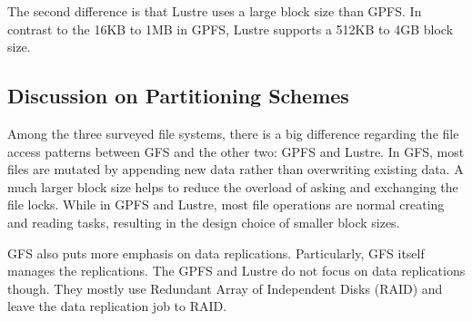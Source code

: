 The second difference is that Lustre uses a large block size than GPFS.
%
In contrast to the 16KB to 1MB in GPFS, Lustre supports a 512KB to 4GB 
block size.


\subsection{Discussion on Partitioning Schemes}
\label{sec:discuss_partitioning}
%
Among the three surveyed file systems, there is a big difference regarding 
the file access patterns between GFS and the other two: GPFS and Lustre.
%
In GFS, most files are mutated by appending new data rather than 
overwriting existing data. 
%
A much larger block size helps to reduce the overload of asking and exchanging
the file locks. 
%
While in GPFS and Lustre, most file operations are normal creating and reading
tasks, resulting in the design choice of smaller block sizes.

GFS also puts more emphasis on data replications. 
%
Particularly, GFS itself manages the replications.
%
The GPFS and Lustre do not focus on data replications though.
%
They mostly use Redundant Array of Independent Disks (RAID) and leave
the data replication job to RAID.
 



